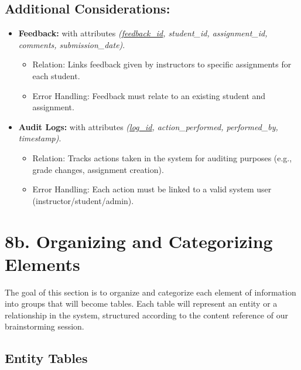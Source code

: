 \documentclass[12pt]{article}
\begin{document}
\subsection*{Additional Considerations:}

\begin{itemize}
    \item \textbf{Feedback:} with attributes \textit{(\underline{feedback\_id}, student\_id, assignment\_id, comments, submission\_date)}.
    \begin{itemize}
        \item Relation: Links feedback given by instructors to specific assignments for each student.
        \item Error Handling: Feedback must relate to an existing student and assignment.
    \end{itemize}

    \item \textbf{Audit Logs:} with attributes \textit{(\underline{log\_id}, action\_performed, performed\_by, timestamp)}.
    \begin{itemize}
        \item Relation: Tracks actions taken in the system for auditing purposes (e.g., grade changes, assignment creation).
        \item Error Handling: Each action must be linked to a valid system user (instructor/student/admin).
    \end{itemize}
\end{itemize}

\section*{8b. Organizing and Categorizing Elements}

The goal of this section is to organize and categorize each element of information into groups that will become tables. Each table will represent an entity or a relationship in the system, structured according to the content reference of our brainstorming session.

\subsection*{Entity Tables}
\end{document}
